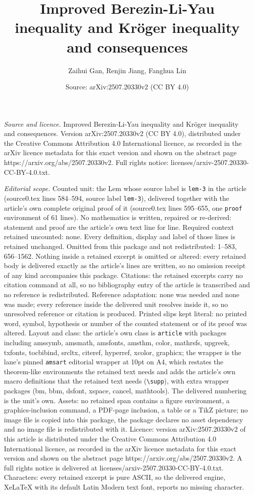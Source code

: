 \documentclass[10pt,a4paper]{amsart}
\title[Improved Berezin-Li-Yau inequality and Kr\"oger inequality a]{Improved Berezin-Li-Yau inequality and Kr\"oger inequality and consequences}
\author{Zaihui Gan, Renjin Jiang, Fanghua Lin}
\date{Source: arXiv:2507.20330v2 (CC BY 4.0)}
\begin{document}
\maketitle

\noindent\emph{Source and licence.} Improved Berezin-Li-Yau inequality and Kr\"oger inequality and consequences. Version arXiv:2507.20330v2 (CC BY 4.0), distributed under the Creative Commons Attribution 4.0 International licence, as recorded in the arXiv licence metadata for this exact version and shown on the abstract page https://arxiv.org/abs/2507.20330v2. Full rights notice: licenses/arxiv-2507.20330-CC-BY-4.0.txt.\par\smallskip

\noindent\textit{Editorial scope.} Counted unit: the Lem whose source label is \texttt{lem-3} in the article (source0.tex lines 584--594, source label \texttt{lem-3}), delivered together with the article's own complete original proof of it (source0.tex lines 595--655, one \texttt{proof} environment of 61 lines). No mathematics is written, repaired or re-derived: statement and proof are the article's own text line for line. Required context retained uncounted: none. Every definition, display and label of those lines is retained unchanged. Omitted from this package and not redistributed: 1--583, 656--1562. Nothing inside a retained excerpt is omitted or altered: every retained body is delivered exactly as the article's lines are written, so no omission receipt of any kind accompanies this package. Citations: the retained excerpts carry no citation command at all, so no bibliography entry of the article is transcribed and no reference is redistributed. Reference adaptation: none was needed and none was made; every reference inside the delivered unit resolves inside it, so no unresolved reference or citation is produced. Printed slips kept literal: no printed word, symbol, hypothesis or number of the counted statement or of its proof was altered. Layout and class: the article's own class is \texttt{article} with packages including amssymb, amsmath, amsfonts, amsthm, color, mathrsfs, upgreek, txfonts, tocbibind, srcltx, citeref, hyperref, xcolor, graphicx; the wrapper is the lane's pinned \texttt{amsart} editorial wrapper at 10pt on A4, which restates the theorem-like environments the retained text needs and adds the article's own macro definitions that the retained text needs (\texttt{\textbackslash supp}), with extra wrapper packages (bm, bbm, dsfont, xspace, cancel, mathtools). The delivered numbering is the unit's own. Assets: no retained span contains a figure environment, a graphics-inclusion command, a PDF-page inclusion, a table or a TikZ picture; no image file is copied into this package, the package declares no asset dependency and no image file is redistributed with it. Licence: version arXiv:2507.20330v2 of this article is distributed under the Creative Commons Attribution 4.0 International licence, as recorded in the arXiv licence metadata for this exact version and shown on the abstract page https://arxiv.org/abs/2507.20330v2. A full rights notice is delivered at licenses/arxiv-2507.20330-CC-BY-4.0.txt. Characters: every retained excerpt is pure ASCII, so the delivered engine, XeLaTeX with its default Latin Modern text font, reports no missing character.
\end{document}
